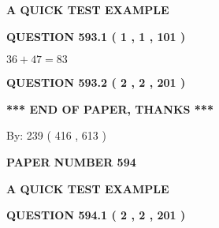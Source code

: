 \documentclass[12pt]{article}
\begin{document}
   
   
   
   
   
 \vspace{0.2in}
{\LARGE {\textbf{ A QUICK TEST EXAMPLE}}}
   
   
  
\vspace{0.2in}
  
{\textbf{\Large{QUESTION
593.1 
 ( 1 , 1 , 101 )
}}}
  
  
 
 

$ %
36 +  %
47=   %
83$
 
 
  
\vspace{0.2in}
  
{\textbf{\Large{QUESTION
593.2 
 ( 2 , 2 , 201 )
}}}
  
  
   
   
 \vspace{0.2in}
 
   
   
   
   
\vspace{1.0in} 
{\textbf{\large{ *** END OF PAPER, THANKS *** }}} 
   
   
\hspace{1.0in} By: 
 239 ( 416 ,  613 )
   
   
   
   
\newpage 
\setcounter{page}{ 
   594001 } 
   
   
   
   
 {\textbf{ \Large{ PAPER NUMBER  594  }}}
   
   
\vspace{0.2in}
   
   
   
   
   
   
 \vspace{0.2in}
{\LARGE {\textbf{ A QUICK TEST EXAMPLE}}}
   
   
  
\vspace{0.2in}
  
{\textbf{\Large{QUESTION
594.1 
 ( 2 , 2 , 201 )
}}}
  
  
  
\vspace{0.2in}
  
\end{document}
